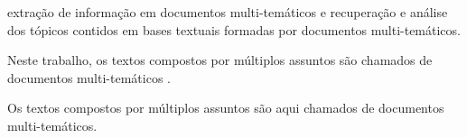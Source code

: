 



extração de informação em documentos multi-temáticos e recuperação e análise dos tópicos contidos em bases textuais formadas por documentos multi-temáticos. 










Neste trabalho, os textos compostos por múltiplos assuntos são chamados de documentos multi-temáticos .

Os textos compostos por múltiplos assuntos são aqui chamados de documentos multi-temáticos.








